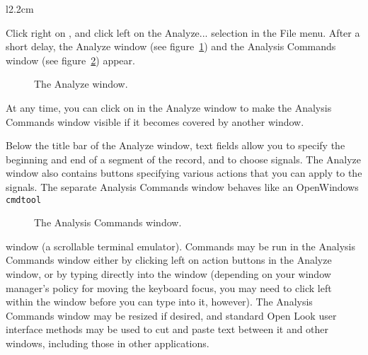 \documentclass[twoside]{book}
\newcommand{\button}[1]{\cornersize{2}\ovalbox{\rule[-.3mm]{0cm}{2.5mm}\small\sf ~#1~}}
\newcommand{\menubutton}[1]{\button{#1~\ensuremath{\nabla}}}
\begin{document}
\begin{wrapfigure}[9]{l}{2.2cm}
\mbox{}
\end{wrapfigure}
Click right on \menubutton{File}, and click left on the {\sf Analyze...}
selection in the File menu.  After a short delay, the {\sf Analyze}
window (see figure~\ref{fig:analyze-window}) and the
{\sf Analysis Commands} window (see figure~\ref{fig:analysis-commands}) appear.
\begin{figure}
\centerline{}
\caption{The {\sf Analyze} window.}
\begin{htmlonly}
\end{htmlonly}
\begin{latexonly}
\end{latexonly}
\label{fig:analyze-window}
\end{figure}
At any time, you can click on \button{Show command window} in the {\sf Analyze}
window to make the {\sf Analysis Commands} window visible if it becomes
covered by another window.

Below the title bar of the {\sf Analyze} window, text fields allow you to
specify the beginning and end of a segment of the record, and to
choose signals.  The {\sf Analyze} window also contains buttons specifying
various actions that you can apply to the signals.  The separate
{\sf Analysis Commands} window behaves like an OpenWindows {\tt cmdtool}
\begin{figure}
\centerline{}
\caption{The {\sf Analysis Commands} window.}
\begin{htmlonly}
\end{htmlonly}
\begin{latexonly}
\end{latexonly}
\label{fig:analysis-commands}
\end{figure}
window (a scrollable terminal emulator).  Commands may be run in the
{\sf Analysis Commands} window either by clicking left on action buttons
in the {\sf Analyze} window, or by typing directly into the window (depending
on your window manager's policy for moving the keyboard focus, you may
need to click left within the window before you can type into it,
however).  The {\sf Analysis Commands} window may be resized if desired, and
standard Open Look user interface methods may be used to cut and paste
text between it and other windows, including those in other
applications.
\end{document}
